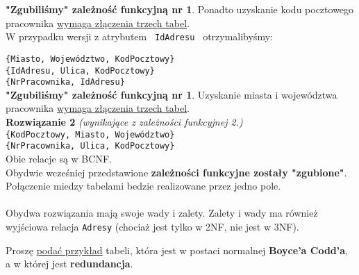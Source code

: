 \textbf{"Zgubiliśmy" zależność funkcyjną nr 1}. Ponadto uzyskanie kodu
pocztowego\\ pracownika \underline{wymaga złączenia trzech tabel}.\\

W przypadku wersji z atrybutem \texttt{ IdAdresu } otrzymalibyśmy:

\texttt{\{Miasto, Województwo, {\color{blue}\faKey}KodPocztowy\}}\\
\texttt{\{{\color{red}\faKey}IdAdresu, {\color{blue}\faKey}Ulica,
{\color{blue}\faKey}KodPocztowy\}}\\
\texttt{\{{\color{green}\faKey}NrPracownika, IdAdresu\}}\\

\textbf{"Zgubiliśmy" zależność funkcyjną nr 1}. Uzyskanie miasta i województwa
pracownika \underline{wymaga złączenia trzech tabel}.\\

\textbf{Rozwiązanie 2} \textit{(wynikające z zależności funkcyjnej 2.)}\\

\texttt{\{{\color{green}\faKey}KodPocztowy, Miasto, Województwo\}}\\
\texttt{\{{\color{green}\faKey}NrPracownika, Ulica, KodPocztowy\}}\\

Obie relacje są w BCNF.\\
Obydwie wcześniej przedstawione \textbf{zależności funkcyjne zostały
"zgubione"}.
Połączenie miedzy tabelami bedzie realizowane przez jedno pole.\\\\

Obydwa rozwiązania mają swoje wady i zalety. Zalety i wady ma również
wyjściowa relacja \texttt{Adresy} (chociaż jest tylko w 2NF, nie jest w
3NF).

\pagebreak

\horrule{0.5pt}
Proszę \underline{podać przykład} tabeli, która jest w postaci normalnej
\textbf{Boyce’a Codd’a}, a w której jest \textbf{redundancja}.\\
\horrule{0.5pt}

\vskip 0.5cm

